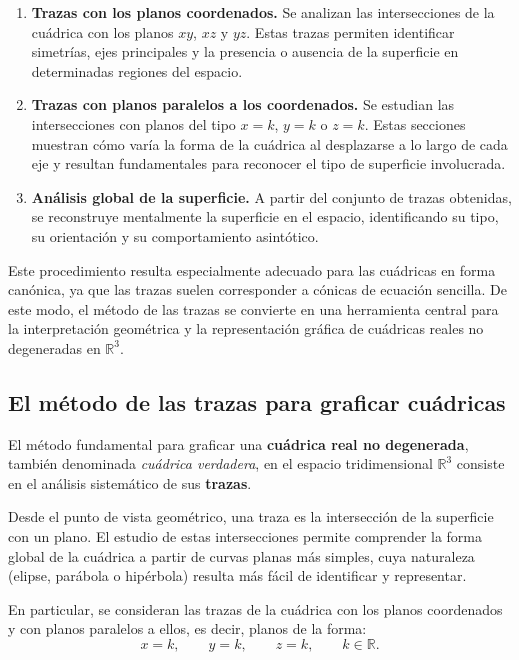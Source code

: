 \documentclass[11pt]{article}
\begin{document}
\begin{enumerate}
    \item \textbf{Trazas con los planos coordenados.}  
    Se analizan las intersecciones de la cuádrica con los planos $xy$, $xz$ y $yz$. Estas trazas permiten identificar simetrías, ejes principales y la presencia o ausencia de la superficie en determinadas regiones del espacio.

    \item \textbf{Trazas con planos paralelos a los coordenados.}  
    Se estudian las intersecciones con planos del tipo $x=k$, $y=k$ o $z=k$. Estas secciones muestran cómo varía la forma de la cuádrica al desplazarse a lo largo de cada eje y resultan fundamentales para reconocer el tipo de superficie involucrada.

    \item \textbf{Análisis global de la superficie.}  
    A partir del conjunto de trazas obtenidas, se reconstruye mentalmente la superficie en el espacio, identificando su tipo, su orientación y su comportamiento asintótico.
\end{enumerate}

Este procedimiento resulta especialmente adecuado para las cuádricas en forma canónica, ya que las trazas suelen corresponder a cónicas de ecuación sencilla. De este modo, el método de las trazas se convierte en una herramienta central para la interpretación geométrica y la representación gráfica de cuádricas reales no degeneradas en $\mathbb{R}^3$.


\subsection*{El método de las trazas para graficar cuádricas}

El método fundamental para graficar una \textbf{cuádrica real no degenerada}, también denominada \emph{cuádrica verdadera}, en el espacio tridimensional $\mathbb{R}^3$ consiste en el análisis sistemático de sus \textbf{trazas}.

Desde el punto de vista geométrico, una traza es la intersección de la superficie con un plano. El estudio de estas intersecciones permite comprender la forma global de la cuádrica a partir de curvas planas más simples, cuya naturaleza (elipse, parábola o hipérbola) resulta más fácil de identificar y representar.

En particular, se consideran las trazas de la cuádrica con los planos coordenados y con planos paralelos a ellos, es decir, planos de la forma:
\[
x = k, \qquad y = k, \qquad z = k, \qquad k \in \mathbb{R}.
\]
\end{document}
